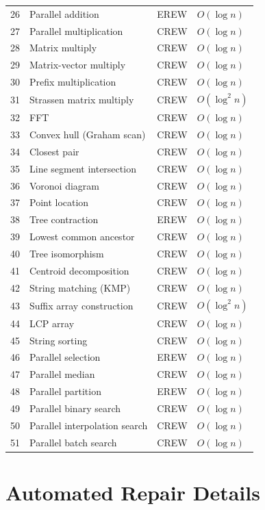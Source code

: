 \documentclass[11pt]{article}
\begin{document}
\begin{table}[p]
\begin{tabular}{@{}rlll@{}}
\midrule
26 & Parallel addition & EREW & $O(\log n)$ \\
27 & Parallel multiplication & CREW & $O(\log n)$ \\
28 & Matrix multiply & CREW & $O(\log n)$ \\
29 & Matrix-vector multiply & CREW & $O(\log n)$ \\
30 & Prefix multiplication & CREW & $O(\log n)$ \\
31 & Strassen matrix multiply & CREW & $O(\log^2 n)$ \\
32 & FFT & CREW & $O(\log n)$ \\
\midrule
33 & Convex hull (Graham scan) & CREW & $O(\log n)$ \\
34 & Closest pair & CREW & $O(\log n)$ \\
35 & Line segment intersection & CREW & $O(\log n)$ \\
36 & Voronoi diagram & CREW & $O(\log n)$ \\
37 & Point location & CREW & $O(\log n)$ \\
\midrule
38 & Tree contraction & EREW & $O(\log n)$ \\
39 & Lowest common ancestor & CREW & $O(\log n)$ \\
40 & Tree isomorphism & CREW & $O(\log n)$ \\
41 & Centroid decomposition & CREW & $O(\log n)$ \\
\midrule
42 & String matching (KMP) & CREW & $O(\log n)$ \\
43 & Suffix array construction & CREW & $O(\log^2 n)$ \\
44 & LCP array & CREW & $O(\log n)$ \\
45 & String sorting & CREW & $O(\log n)$ \\
\midrule
46 & Parallel selection & EREW & $O(\log n)$ \\
47 & Parallel median & CREW & $O(\log n)$ \\
48 & Parallel partition & EREW & $O(\log n)$ \\
\midrule
49 & Parallel binary search & CREW & $O(\log n)$ \\
50 & Parallel interpolation search & CREW & $O(\log n)$ \\
51 & Parallel batch search & CREW & $O(\log n)$ \\
\bottomrule
\end{tabular}
\end{table}

\section{Automated Repair Details}
\label{app:repair}
\end{document}
